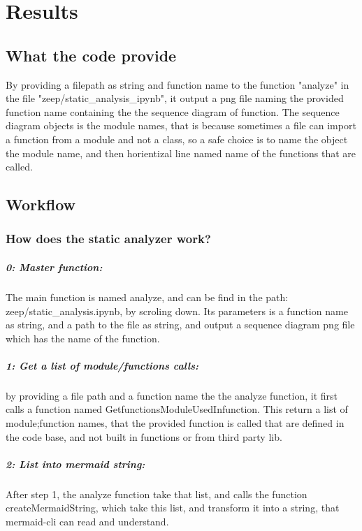 \documentclass[12pt,a4paper]{report}
\begin{document}
    \chapter{Results}

    \section{What the code provide}
    By providing a filepath as string and function name to the function "analyze" in the file "zeep/static\_analysis\_ipynb", it output a png file naming the provided function name containing the the sequence diagram of function. The sequence diagram objects is the module names, that is because sometimes a file can import a function from a module and not a class, so a safe choice is to name the object the module name, and then horientizal line named name of the functions that are called. 
   
   
    \section{Workflow}
   
 
    \subsection*{How does the static analyzer work?}
    
    \paragraph{0: Master function:} The main function is named analyze, and can be find in the path: zeep/static\_analysis.ipynb, by scroling down. Its parameters is a function name as string, and a path to the file as string, and output a sequence diagram png file which has the name of the function. 

    \paragraph*{1: Get a list of module/functions calls:}
    by providing a file path and a function name the the analyze function, it first calls a function named GetfunctionsModuleUsedInfunction. 
    This return a list of module;function names, that the provided function is called that are defined in the code base, and not built in functions or from third party lib. 
    
    \paragraph{2: List into mermaid string:}
    After step 1, the analyze function take that list, and calls the function createMermaidString, which take this list, and transform it into a string, that mermaid-cli can read and understand. 
\end{document}

